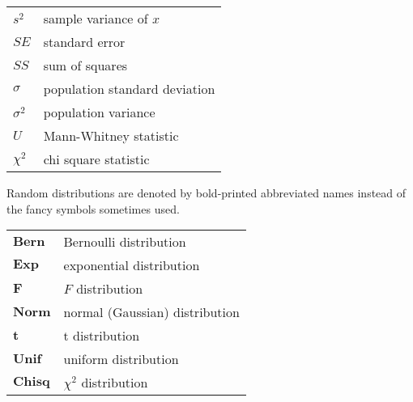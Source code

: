 \begin{longtable}{p{}p{}}
  $s^2$             & sample variance of $x$ \\
  $SE$              & standard error \\
  $SS$              & sum of squares \\
  $\sigma$          & population standard deviation \\
  $\sigma^2$        & population variance \\
  $U$               & Mann-Whitney statistic \\
  $\chi^2$          & chi square statistic \\
\end{longtable}

\vspace{\baselineskip}
\noindent Random distributions are denoted by bold-printed abbreviated names instead of the fancy symbols sometimes used.
\vspace{\baselineskip}

\begin{longtable}{p{}p{}}
  $\mathbf{Bern}$   & Bernoulli distribution \\
  $\mathbf{Exp}$    & exponential distribution \\
  $\mathbf{F}$      & $F$ distribution \\
  $\mathbf{Norm}$   & normal (Gaussian) distribution \\
  $\mathbf{t}$      & t distribution \\
  $\mathbf{Unif}$   & uniform distribution \\
  $\mathbf{Chisq}$  & $\chi^2$ distribution \\
\end{longtable}
